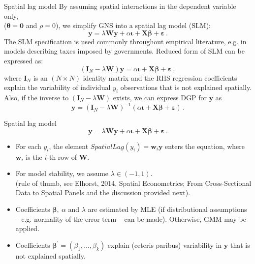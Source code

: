 \documentclass{beamer}
\begin{document}
\begin{frame}{Spatial lag model}
By assuming spatial interactions in the dependent variable only, \\($\bm{\theta}=\bm{0}$ and $\rho=0$), we simplify GNS into a spatial lag model (SLM):
\begin{equation*} 
\bm{y} = \lambda \bm{W\!y} + \alpha \bm{\iota} + \bm{X \beta} + \bm{\varepsilon}\,.
\end{equation*}
The SLM specification is used commonly throughout empirical literature, e.g. in models describing taxes imposed by governments. Reduced form of SLM can be expressed as:
\begin{equation*} 
(\bm{I}_{N} - \lambda \bm{W}) \bm{y} = \alpha \bm{\iota} + \bm{X \beta} + \bm{\varepsilon}\,,
\end{equation*}
where $\bm{I}_{N}$ is an $(N\! \times \!N)$ identity matrix and the RHS regression coefficients explain the variability of individual $y_{i}$ observations that is not explained spatially. Also, if the inverse to $(\bm{I}_{N} - \lambda \bm{W})$ exists, we can express DGP for $\bm{y}$ as
\begin{equation*}
\bm{y} = (\bm{I}_{N} - \lambda \bm{W})^{-1} (\alpha \bm{\iota} + \bm{X \beta} + \bm{\varepsilon})\,.
\end{equation*}
\end{frame}
\begin{frame}{Spatial lag model}
\begin{equation*} 
\bm{y} = \lambda \bm{W\!y} + \alpha \bm{\iota} + \bm{X \beta} + \bm{\varepsilon}\,.
\end{equation*}
\begin{itemize}
    \item For each $y_i$, the element $\textit{SpatialLag}(y_{i}) = \bm{w}_i \bm{y}$ enters the equation, where $\bm{w}_i$ is the $i$-th row of $\bm{W}$.
    \smallskip
    \item For model stability, we assume $\lambda \in (-1,1)$. \\(rule of thumb, see Elhorst, 2014, Spatial Econometrics; From Cross-Sectional Data to Spatial Panels and the discussion provided next).
    \smallskip
    \item Coefficients $\bm{\beta},~\alpha$ and $\lambda$ are estimated by MLE (if distributional assumptions -- e.g. normality of the error term -- can be made).  Otherwise, GMM may be applied.
    \smallskip
    \item Coefficients $\bm{\beta}^{\prime} = (\beta_1, \dots, \beta_k)$ explain (ceteris paribus) variability in $\bm{y}$ that is not explained spatially.
\end{itemize}
\end{frame}
\end{document}
